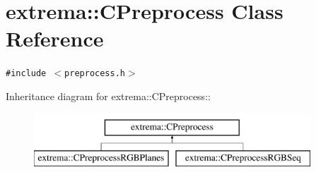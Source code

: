 \hypertarget{classextrema_1_1CPreprocess}{
\section{extrema::CPreprocess Class Reference}
\label{classextrema_1_1CPreprocess}
}
{\tt \#include $<$preprocess.h$>$}

Inheritance diagram for extrema::CPreprocess::\begin{figure}[H]
\begin{center}
\leavevmode
\includegraphics[height=2cm]{classextrema_1_1CPreprocess}
\end{center}
\end{figure}

